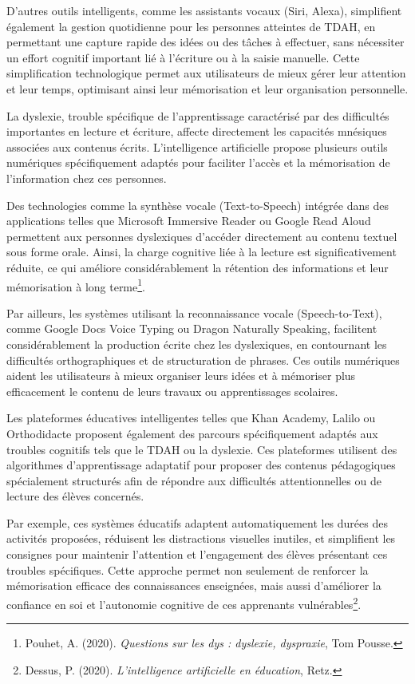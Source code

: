 \documentclass[11pt,a4paper]{report}
\begin{document}
D’autres outils intelligents, comme les assistants vocaux (Siri, Alexa), simplifient également la gestion quotidienne pour les personnes atteintes de TDAH, en permettant une capture rapide des idées ou des tâches à effectuer, sans nécessiter un effort cognitif important lié à l’écriture ou à la saisie manuelle. Cette simplification technologique permet aux utilisateurs de mieux gérer leur attention et leur temps, optimisant ainsi leur mémorisation et leur organisation personnelle.

La dyslexie, trouble spécifique de l’apprentissage caractérisé par des difficultés importantes en lecture et écriture, affecte directement les capacités mnésiques associées aux contenus écrits. L’intelligence artificielle propose plusieurs outils numériques spécifiquement adaptés pour faciliter l’accès et la mémorisation de l’information chez ces personnes.

Des technologies comme la synthèse vocale (Text-to-Speech) intégrée dans des applications telles que Microsoft Immersive Reader ou Google Read Aloud permettent aux personnes dyslexiques d’accéder directement au contenu textuel sous forme orale. Ainsi, la charge cognitive liée à la lecture est significativement réduite, ce qui améliore considérablement la rétention des informations et leur mémorisation à long terme\footnote{Pouhet, A. (2020). \textit{Questions sur les dys : dyslexie, dyspraxie}, Tom Pousse.}.

Par ailleurs, les systèmes utilisant la reconnaissance vocale (Speech-to-Text), comme Google Docs Voice Typing ou Dragon Naturally Speaking, facilitent considérablement la production écrite chez les dyslexiques, en contournant les difficultés orthographiques et de structuration de phrases. Ces outils numériques aident les utilisateurs à mieux organiser leurs idées et à mémoriser plus efficacement le contenu de leurs travaux ou apprentissages scolaires.

Les plateformes éducatives intelligentes telles que Khan Academy, Lalilo ou Orthodidacte proposent également des parcours spécifiquement adaptés aux troubles cognitifs tels que le TDAH ou la dyslexie. Ces plateformes utilisent des algorithmes d’apprentissage adaptatif pour proposer des contenus pédagogiques spécialement structurés afin de répondre aux difficultés attentionnelles ou de lecture des élèves concernés.

Par exemple, ces systèmes éducatifs adaptent automatiquement les durées des activités proposées, réduisent les distractions visuelles inutiles, et simplifient les consignes pour maintenir l’attention et l’engagement des élèves présentant ces troubles spécifiques. Cette approche permet non seulement de renforcer la mémorisation efficace des connaissances enseignées, mais aussi d’améliorer la confiance en soi et l’autonomie cognitive de ces apprenants vulnérables\footnote{Dessus, P. (2020). \textit{L’intelligence artificielle en éducation}, Retz.}.
\end{document}
